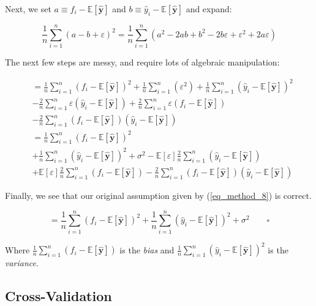 \documentclass[a4paper,10pt,english]{article}
\begin{document}
Next, we set $a \equiv f_i - \mathbb{E}[\hat{\mathbf{y}}] $ and $b \equiv \hat{y}_i - \mathbb{E}[\hat{\mathbf{y}}]$ and expand:

\begin{equation*}
\frac{1}{n} \sum_{i=1}^{n} (a - b + \varepsilon )^2
= \frac{1}{n} \sum_{i=1}^{n} ( a^2 - 2ab + b^2 - 2b\varepsilon + \varepsilon^2 + 2a\varepsilon )
\end{equation*}

The next few steps are messy, and require lots of algebraic manipulation:	

\begin{align*}	
&= \frac{1}{n} \sum_{i=1}^{n} ( f_i - \mathbb{E}[\hat{\mathbf{y}}] )^2 
+ \frac{1}{n} \sum_{i=1}^{n} ( \varepsilon^2 )
+ \frac{1}{n} \sum_{i=1}^{n} ( \hat{y}_i - \mathbb{E}[\hat{\mathbf{y}}] )^2 
\\&- \frac{2}{n} \sum_{i=1}^{n} \varepsilon ( \hat{y}_i - \mathbb{E}[\hat{\mathbf{y}}] )
+ \frac{2}{n} \sum_{i=1}^{n} \varepsilon ( f_i - \mathbb{E}[\hat{\mathbf{y}}] )
\\&- \frac{2}{n} \sum_{i=1}^{n} ( f_i - \mathbb{E}[\hat{\mathbf{y}}] ) ( \hat{y}_i - \mathbb{E}[\hat{\mathbf{y}}] )
\\&= \frac{1}{n} \sum_{i=1}^{n} ( f_i - \mathbb{E}[\hat{\mathbf{y}}] )^2 
\\&+ \frac{1}{n} \sum_{i=1}^{n} ( \hat{y}_i - \mathbb{E}[\hat{\mathbf{y}}] )^2 
+ \sigma^2
- \mathbb{E}[\varepsilon] \frac{2}{n} \sum_{i=1}^{n} ( \hat{y}_i - \mathbb{E}[\hat{\mathbf{y}}] )
\\&+ \mathbb{E}[\varepsilon] \frac{2}{n} \sum_{i=1}^{n} ( f_i - \mathbb{E}[\hat{\mathbf{y}}] )
-\frac{2}{n} \sum_{i=1}^{n} ( f_i - \mathbb{E}[\hat{\mathbf{y}}] ) ( \hat{y}_i - \mathbb{E}[\hat{\mathbf{y}}] )
\end{align*}

Finally, we see that our original assumption given by (\ref{eq_method_8}) is correct.

\begin{equation*}
= \frac{1}{n} \sum_{i=1}^{n} ( f_i - \mathbb{E}[\hat{\mathbf{y}}] )^2 
+ \frac{1}{n} \sum_{i=1}^{n} ( \hat{y}_i - \mathbb{E}[\hat{\mathbf{y}}] )^2 
+ \sigma^2 \qquad \square
\end{equation*}

Where $\frac{1}{n} \sum_{i=1}^{n} ( f_i - \mathbb{E}[\hat{\mathbf{y}}] )$ is the \textit{bias} and
$\frac{1}{n} \sum_{i=1}^{n} ( \hat{y}_i - \mathbb{E}[\hat{\mathbf{y}}] )^2$ is the \textit{variance}.	

\subsection{Cross-Validation}
\end{document}
